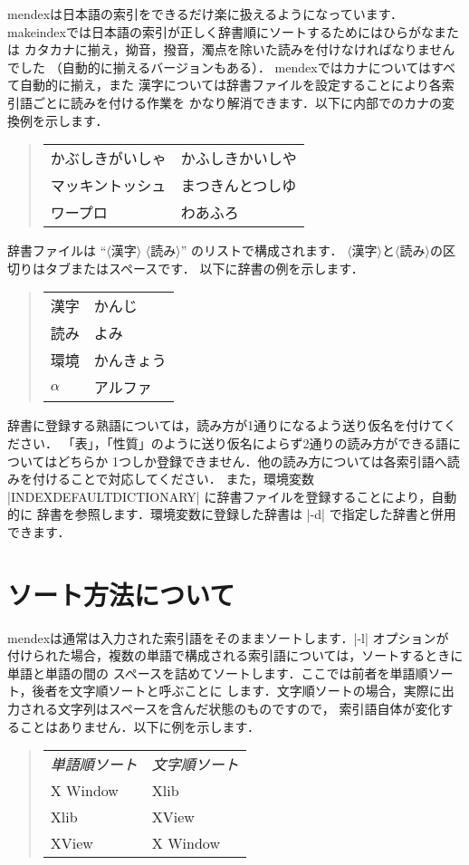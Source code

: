 \documentclass[a4paper]{jsarticle}
\newcommand{\SoftName}[1]{\textsf{#1}}
\newcommand{\jMeta}[1]{$\langle$\mbox{}\textsf{#1}\mbox{}$\rangle$}
\begin{document}
\SoftName{mendex}は日本語の索引をできるだけ楽に扱えるようになっています．
\SoftName{makeindex}では日本語の索引が正しく辞書順にソートするためにはひらがなまたは
カタカナに揃え，拗音，撥音，濁点を除いた読みを付けなければなりませんでした
（自動的に揃えるバージョンもある）． mendexではカナについてはすべて自動的に揃え，また
漢字については辞書ファイルを設定することにより各索引語ごとに読みを付ける作業を
かなり解消できます．以下に内部でのカナの変換例を示します．
%
\begin{quote}
\begin{tabular}{ll}
かぶしきがいしゃ & かふしきかいしや \\
マッキントッシュ & まつきんとつしゆ \\
ワープロ & わあふろ
\end{tabular}
\end{quote}

辞書ファイルは ``\jMeta{漢字} \jMeta{読み}'' のリストで構成されます．
\jMeta{漢字}と\jMeta{読み}の区切りはタブまたはスペースです． 以下に辞書の例を示します．
%
\begin{quote}
\begin{tabular}{ll}
漢字 & かんじ \\
読み & よみ \\
環境 & かんきょう \\
$\alpha$ & アルファ
\end{tabular}
\end{quote}

辞書に登録する熟語については，読み方が1通りになるよう送り仮名を付けてください．
「表」，「性質」のように送り仮名によらず2通りの読み方ができる語についてはどちらか
1つしか登録できません．他の読み方については各索引語へ読みを付けることで対応してください．
また，環境変数 |INDEXDEFAULTDICTIONARY| に辞書ファイルを登録することにより，自動的に
辞書を参照します．環境変数に登録した辞書は |-d| で指定した辞書と併用できます．

\section{ソート方法について}

\SoftName{mendex}は通常は入力された索引語をそのままソートします．|-l| オプションが
付けられた場合，複数の単語で構成される索引語については，ソートするときに単語と単語の間の
スペースを詰めてソートします．ここでは前者を単語順ソート，後者を文字順ソートと呼ぶことに
します．文字順ソートの場合，実際に出力される文字列はスペースを含んだ状態のものですので，
索引語自体が変化することはありません．以下に例を示します．
%
\begin{quote}
\begin{tabular}{ll}
\emph{単語順ソート} & \emph{文字順ソート} \\
X Window & Xlib \\
Xlib & XView \\
XView & X Window
\end{tabular}
\end{quote}
\end{document}
